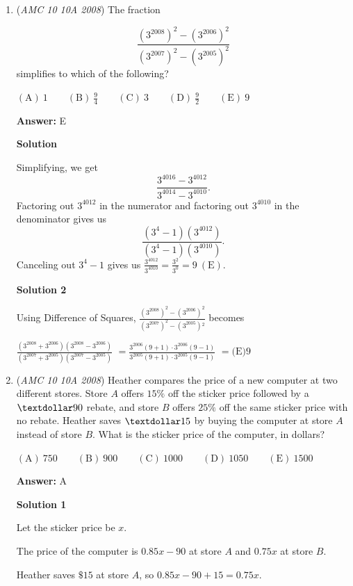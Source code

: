 \begin{enumerate}
 


	\item (\textit{AMC 10 10A 2008}) The fraction

 \[\frac{\left(3^{2008}\right)^2-\left(3^{2006}\right)^2}{\left(3^{2007}\right)^2-\left(3^{2005}\right)^2}\]
simplifies to which of the following?


 $\mathrm{(A)}\ 1\qquad\mathrm{(B)}\ \frac{9}{4}\qquad\mathrm{(C)}\ 3\qquad\mathrm{(D)}\ \frac{9}{2}\qquad\mathrm{(E)}\ 9$

 \textbf{Answer: }E



\textbf{Solution}

Simplifying, we get 
 \[\frac{3^{4016}-3^{4012}}{3^{4014}-3^{4010}}.\] Factoring out $3^{4012}$ in the numerator and factoring out $3^{4010}$ in the denominator gives us 
 \[\frac{(3^4-1)(3^{4012})}{(3^4-1)(3^{4010})}.\] Canceling out $3^4-1$ gives us $\frac{3^{4012}}{3^{4010}}=\frac{3^2}{3^0}=9\ \mathrm{(E)}.$




\textbf{Solution 2}

Using Difference of Squares, $\frac{(3^{2008})^{2}-(3^{2006})^{2}}{(3^{2007})^{2}-(3^{2005}){^2}}$ becomes

 $\frac{(3^{2008}+3^{2006})(3^{2008}-3^{2006})}{(3^{2007}+3^{2005})(3^{2007}-3^{2005})}$
$= \frac{3^{2006}(9+1) \cdot 3^{2006}(9-1)}{3^{2005}(9+1) \cdot 3^{2005}(9-1)}$
$= \boxed{\text{(E)}9}$



	\item (\textit{AMC 10 10A 2008}) Heather compares the price of a new computer at two different stores. Store $A$ offers $15\%$ off the sticker price followed by a $\textdollar90$ rebate, and store $B$ offers $25\%$ off the same sticker price with no rebate. Heather saves $\textdollar15$ by buying the computer at store $A$ instead of store $B$. What is the sticker price of the computer, in dollars?


 $\mathrm{(A)}\ 750\qquad\mathrm{(B)}\ 900\qquad\mathrm{(C)}\ 1000\qquad\mathrm{(D)}\ 1050\qquad\mathrm{(E)}\ 1500$

 \textbf{Answer: }A



\textbf{Solution 1}

Let the sticker price be $x$.

 The price of the computer is $0.85x-90$ at store $A$ and $0.75x$ at store $B$.

 Heather saves $\$15$ at store $A$, so $0.85x-90+15=0.75x$.


\end{enumerate}
